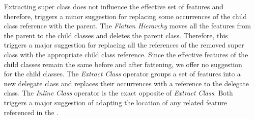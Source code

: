 Extracting super class does not influence the effective set of features and therefore, triggers a minor suggestion for replacing some occurrences of the child class reference with the parent. The \textit{Flatten Hierarchy} moves all the features from the parent to the child classes and deletes the parent class. Therefore, this triggers a major suggestion for replacing all the references of the removed super class with the appropriate child class reference. Since the effective features of the child classes remain the same before and after fattening, we offer no suggestion for the child classes. The \textit{Extract Class} operator groups a set of features into a new delegate class and replaces their occurrences with a reference to the delegate class. The \textit{Inline Class} operator is the exact opposite of \textit{Extract Class}. Both triggers a major suggestion of adapting the location of any related feature referenced in the \viewtype.

